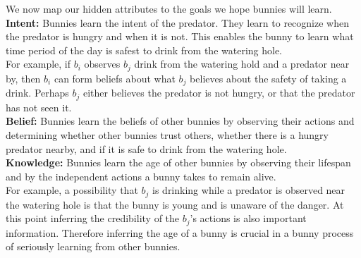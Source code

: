\documentclass[twocolumn]{article}
\begin{document}
We now map our hidden attributes to the goals we hope bunnies will learn. \\

\noindent\textbf{Intent:} Bunnies learn the intent of the predator. They learn to recognize when the predator is hungry and when it is not. This enables the bunny to learn what time period of the day is safest to drink from the watering hole.  \\

For example, if $b_i$ observes $b_j$ drink from the watering hold and a predator near by, then $b_i$ can form beliefs about what $b_j$ believes about the safety of taking a drink. Perhaps $b_j$ either believes the predator is not hungry, or that the predator has not seen it. \\


\noindent\textbf{Belief:} Bunnies learn the beliefs of other bunnies by observing their actions and determining whether other bunnies trust others, whether there is a hungry predator nearby, and if it is safe to drink from the watering hole. \\

\noindent \textbf{Knowledge:} Bunnies learn the age of other bunnies by observing their lifespan and by the independent actions a bunny takes to remain alive. \\

For example, a possibility that $b_j$ is drinking while a predator is observed near the watering hole is that the bunny is young and is unaware of the danger. At this point inferring the credibility of the $b_j$'s actions is also important information. Therefore inferring the age of a bunny is crucial in a bunny process of seriously learning from other bunnies.

% 
% 
\end{document}
